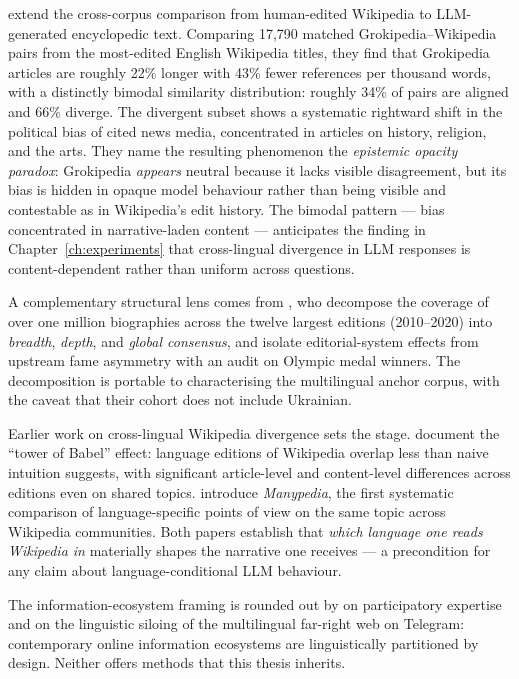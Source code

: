 \citet{yasseri2026grokipedia} extend the cross-corpus comparison from
human-edited Wikipedia to LLM-generated encyclopedic text. Comparing
17{,}790 matched Grokipedia--Wikipedia pairs from the most-edited English
Wikipedia titles, they find that Grokipedia articles are roughly 22\%
longer with 43\% fewer references per thousand words, with a distinctly
bimodal similarity distribution: roughly 34\% of pairs are aligned and
66\% diverge. The divergent subset shows a systematic rightward shift
in the political bias of cited news media, concentrated in articles on
history, religion, and the arts. They name the resulting phenomenon the
\emph{epistemic opacity paradox}: Grokipedia \emph{appears} neutral
because it lacks visible disagreement, but its bias is hidden in opaque
model behaviour rather than being visible and contestable as in
Wikipedia's edit history. The bimodal pattern --- bias concentrated in
narrative-laden content --- anticipates the finding in
Chapter~\ref{ch:experiments} that cross-lingual divergence in LLM
responses is content-dependent rather than uniform across questions.

A complementary structural lens comes from
\citet{yu2025demographic}, who decompose the coverage of over one
million biographies across the twelve largest editions (2010--2020)
into \emph{breadth}, \emph{depth}, and \emph{global consensus}, and
isolate editorial-system effects from upstream fame asymmetry with
an audit on Olympic medal winners. The decomposition is portable to
characterising the multilingual anchor corpus, with the caveat that
their cohort does not include Ukrainian.

Earlier work on cross-lingual Wikipedia divergence sets the stage.
\citet{hecht2010tower} document the ``tower of Babel'' effect: language
editions of Wikipedia overlap less than naive intuition suggests, with
significant article-level and content-level differences across editions
even on shared topics. \citet{massa2013manypedia} introduce
\emph{Manypedia}, the first systematic comparison of language-specific
points of view on the same topic across Wikipedia communities. Both
papers establish that \emph{which language one reads Wikipedia in}
materially shapes the narrative one receives --- a precondition for any
claim about language-conditional LLM behaviour.

The information-ecosystem framing is rounded out by
\citet{pfister2011networked} on participatory expertise and
\citet{urman2022shadows} on the linguistic siloing of the
multilingual far-right web on Telegram: contemporary online
information ecosystems are linguistically partitioned by design.
Neither offers methods that this thesis inherits.


